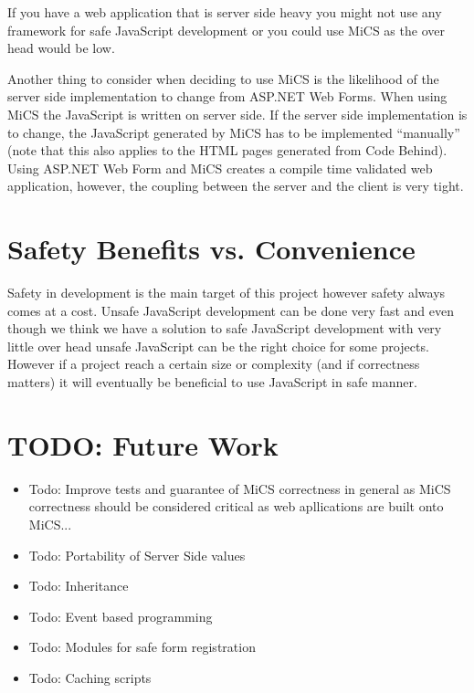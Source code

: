 	If you have a web application that is server side heavy you might not use any framework for safe JavaScript development or you could use MiCS as the over head would be low.

	Another thing to consider when deciding to use MiCS is the likelihood of the server side implementation to change from ASP.NET Web Forms. When using MiCS the JavaScript is written on server side. If the server side implementation is to change, the JavaScript generated by MiCS has to be implemented ``manually'' (note that this also applies to the HTML pages generated from Code Behind). Using ASP.NET Web Form and MiCS creates a compile time validated web application, however, the coupling between the server and the client is very tight.



\section{Safety Benefits vs. Convenience} %
\label{sec:safety_benefits_vs_conveniente}
	Safety in development is the main target of this project however safety always comes at a cost. Unsafe JavaScript development can be done very fast and even though we think we have a solution to safe JavaScript development with very little over head unsafe JavaScript can be the right choice for some projects. However if a project reach a certain size or complexity (and if correctness matters) it will eventually be beneficial to use JavaScript in safe manner.

\section{TODO: Future Work}
\begin{itemize}

	\item Todo: Improve tests and guarantee of MiCS correctness in general as MiCS correctness should be considered critical as web apllications are built onto MiCS...
	\item Todo: Portability of Server Side values
	\item Todo: Inheritance
	\item Todo: Event based programming
	\item Todo: Modules for safe form registration
	\item Todo: Caching scripts

\end{itemize}